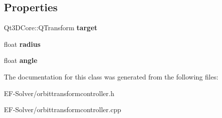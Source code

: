 \subsection*{Properties}
\begin{DoxyCompactItemize}
\item 
Qt3\+D\+Core\+::\+Q\+Transform {\bfseries target}\hypertarget{class_orbit_transform_controller_a1b887289a09be4ddef03f8f676f3b138}{}\label{class_orbit_transform_controller_a1b887289a09be4ddef03f8f676f3b138}

\item 
float {\bfseries radius}\hypertarget{class_orbit_transform_controller_a99c255042c9a78481954775edc7ec6e6}{}\label{class_orbit_transform_controller_a99c255042c9a78481954775edc7ec6e6}

\item 
float {\bfseries angle}\hypertarget{class_orbit_transform_controller_a923e23fca682a1012959b76a7f32cb10}{}\label{class_orbit_transform_controller_a923e23fca682a1012959b76a7f32cb10}

\end{DoxyCompactItemize}


The documentation for this class was generated from the following files\+:\begin{DoxyCompactItemize}
\item 
E\+F-\/\+Solver/orbittransformcontroller.\+h\item 
E\+F-\/\+Solver/orbittransformcontroller.\+cpp\end{DoxyCompactItemize}
